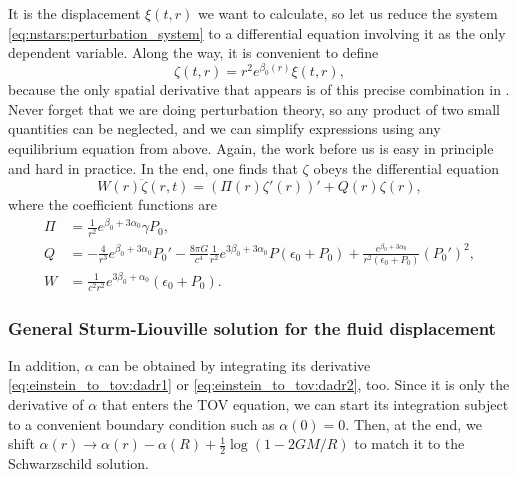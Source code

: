It is the displacement $\xi(t,r)$ we want to calculate, so let us reduce the system \eqref{eq:nstars:perturbation_system} to a differential equation involving it as the only dependent variable.
Along the way, it is convenient to define
\begin{equation}
	\zeta(t,r) = r^2 e^{\beta_0(r)} \xi(t,r),
\label{eq:nstars:definition_zeta}
\end{equation}
because the only spatial derivative that appears is of this precise combination in .
Never forget that we are doing perturbation theory, so any product of two small quantities can be neglected, and we can simplify expressions using any equilibrium equation from above.
Again, the work before us is easy in principle and hard in practice.
In the end, one finds that $\zeta$ obeys the differential equation
\begin{equation}
	W(r) \ddot{\zeta}(r,t) = (\Pi(r) \zeta'(r))' + Q(r) \zeta(r) ,
\label{eq:nstars:diffeq_zeta}
\end{equation}
where the coefficient functions are
\begin{subequations}
\begin{align}
	\Pi &= \frac{1}{r^2} e^{\beta_0 + 3 \alpha_0} \gamma P_0 , \label{eq:nstars:sturm_liouville_coefficients_Pi} \\
	Q   &= -\frac{4}{r^3} e^{\beta_0 + 3 \alpha_0} P_0' - \frac{8 \pi G}{c^4} \frac{1}{r^2} e^{3 \beta_0 + 3 \alpha_0} P (\epsilon_0 + P_0) + \frac{e^{\beta_0 + 3 \alpha_0}}{r^2(\epsilon_0 + P_0)} \left( P_0' \right)^2 , \label{eq:nstars:sturm_liouville_coefficients_Q} \\
	W   &= \frac{1}{c^2 r^2} e^{3 \beta_0 + \alpha_0} (\epsilon_0 + P_0) . \label{eq:nstars:sturm_liouville_coefficients_W}
\end{align}
\label{eq:nstars:sturm_liouville_coefficients}
\end{subequations}

\subsubsection{General Sturm-Liouville solution for the fluid displacement}

In addition, $\alpha$ can be obtained by integrating its derivative \eqref{eq:einstein_to_tov:dadr1} or \eqref{eq:einstein_to_tov:dadr2}, too.
Since it is only the derivative of $\alpha$ that enters the TOV equation, we can start its integration subject to a convenient boundary condition such as $\alpha(0) = 0$.
Then, at the end, we shift $\alpha(r) \rightarrow \alpha(r) - \alpha(R) + \frac12 \log (1 - 2 G M / R)$ to match it to the Schwarzschild solution.

